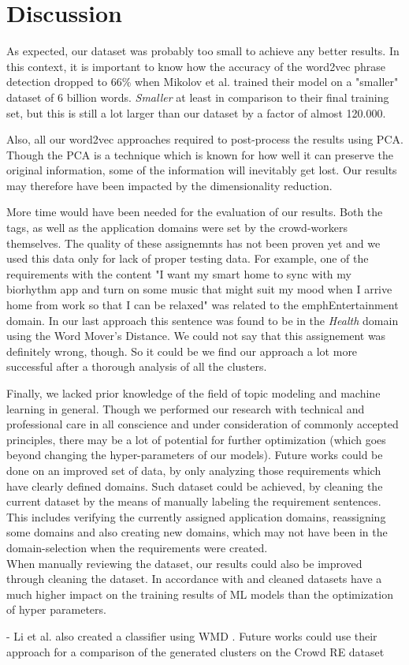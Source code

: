 \section{Discussion}
\label{sec:discussion}
As expected, our dataset was probably too small to achieve any better results. In this context, it is important to know how the accuracy of the word2vec phrase detection dropped to 66\% when Mikolov et al. trained their model on a "smaller" dataset of 6 billion words\cite[p7]{mikolov_distributed_2013}. \emph{Smaller} at least in comparison to their final training set, but this is still a lot larger than our dataset by a factor of almost 120.000.

Also, all our word2vec approaches required to post-process the results using PCA. Though the PCA is a technique which is known for how well it can preserve the original information, some of the information will inevitably get lost. Our results may therefore have been impacted by the dimensionality reduction.

More time would have been needed for the evaluation of our results. Both the tags, as well as the application domains were set by the crowd-workers themselves. The quality of these assignemnts has not been proven yet and we used this data only for lack of proper testing data. For example, one of the requirements with the content "I want my smart home to sync with my biorhythm app and turn on some music that might suit my mood when I arrive home from work so that I can be relaxed" was related to the emph{Entertainment} domain. In our last approach this sentence was found to be in the \emph{Health} domain using the Word Mover's Distance. We could not say that this assignement was definitely wrong, though. So it could be we find our approach a lot more successful after a thorough analysis of all the clusters.

Finally, we lacked prior knowledge of the field of topic modeling and machine learning in general. Though we performed our research with technical and professional care in all conscience and under consideration of commonly accepted principles, there may be a lot of potential for further optimization (which goes beyond changing the hyper-parameters of our models). Future works could be done on an improved set of data, by only analyzing those requirements which have clearly defined domains. Such dataset could be achieved, by cleaning the current \crowdre{} dataset by the means of manually labeling the requirement sentences. This includes verifying the currently assigned application domains, reassigning some domains and also creating new domains, which may not have been in the domain-selection when the requirements were created.\\

When manually reviewing the dataset, our results could also be improved through cleaning the dataset. In accordance with \cite{chu_data_2016} and \cite{krishnan_data_2016}  cleaned datasets have a much higher impact on the training results of ML models than the optimization of hyper parameters. 

- Li et al. also created a classifier using WMD \cite{li_classifying_2019}. Future works could use their approach for a comparison of the generated clusters on the Crowd RE dataset
\\[2cm]